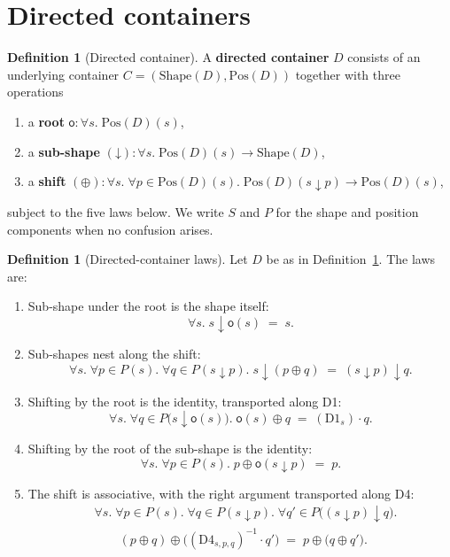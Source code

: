 \documentclass[11pt,a4paper]{article}
\theoremstyle{plain}
\theoremstyle{definition}
\newtheorem{definition}[theorem]{Definition}
\newcommand{\Shape}{\mathrm{Shape}}
\newcommand{\Pos}{\mathrm{Pos}}
\newcommand{\rootpos}{\mathsf{o}}
\newcommand{\sub}{\mathbin{\downarrow}}
\newcommand{\shift}{\oplus}
\begin{document}
\section{Directed containers}

\begin{definition}[Directed container]\label{def:directed}
A \textbf{directed container} $D$ consists of an underlying container
$C=(\Shape(D),\Pos(D))$ together with three operations
\begin{enumerate}
  \item a \textbf{root} $\rootpos:\forall s.\;\Pos(D)(s)$,
  \item a \textbf{sub-shape} $({\sub}):\forall s.\;\Pos(D)(s)\to\Shape(D)$,
  \item a \textbf{shift}
        $({\shift}):\forall s.\;\forall p\in\Pos(D)(s).\;
        \Pos(D)(s\sub p)\to\Pos(D)(s)$,
\end{enumerate}
subject to the five laws below. We write $S$ and $P$ for the shape and
position components when no confusion arises.
\end{definition}

\begin{definition}[Directed-container laws]\label{def:d-laws}
Let $D$ be as in Definition~\ref{def:directed}. The laws are:
\begin{enumerate}
  \item[\textbf{D1.}] Sub-shape under the root is the shape itself:
        \[
          \forall s.\; s\sub\rootpos(s) \;=\; s.
        \]
  \item[\textbf{D4.}] Sub-shapes nest along the shift:
        \[
          \forall s.\;\forall p\in P(s).\;\forall q\in P(s\sub p).\;
          s\sub(p\shift q) \;=\; (s\sub p)\sub q.
        \]
  \item[\textbf{D2.}] Shifting by the root is the identity, transported along
        D1:
        \[
          \forall s.\;\forall q\in P\bigl(s\sub\rootpos(s)\bigr).\;
          \rootpos(s)\shift q \;=\; (\mathrm{D1}_s)\cdot q.
        \]
  \item[\textbf{D3.}] Shifting by the root of the sub-shape is the identity:
        \[
          \forall s.\;\forall p\in P(s).\;
          p\shift\rootpos(s\sub p) \;=\; p.
        \]
  \item[\textbf{D5.}] The shift is associative, with the right argument
        transported along D4:
        \begin{align*}
          &\forall s.\;\forall p\in P(s).\;\forall q\in P(s\sub p).\;
          \forall q'\in P\bigl((s\sub p)\sub q\bigr).\\
          &\qquad
          (p\shift q)\shift\bigl((\mathrm{D4}_{s,p,q})^{-1}\cdot q'\bigr)
          \;=\;
          p\shift\bigl(q\shift q'\bigr).
        \end{align*}
\end{enumerate}
\end{definition}
\end{document}
